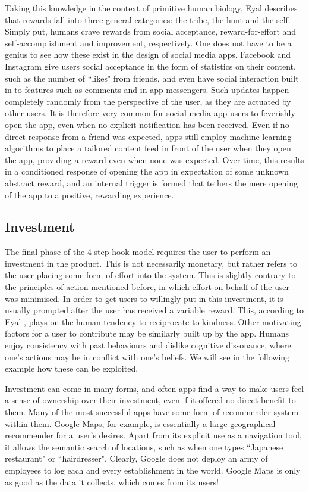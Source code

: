 Taking this knowledge in the context of primitive human biology, Eyal \cite{eyal2014hooked} describes that rewards fall into three general categories: the tribe, the hunt and the self. Simply put, humans crave rewards from social acceptance, reward-for-effort and self-accomplishment and improvement, respectively. One does not have to be a genius to see how these exist in the design of social media apps. Facebook and Instagram give users social acceptance in the form of statistics on their content, such as the number of ``likes" from friends, and even have social interaction built in to features such as comments and in-app messengers. Such updates happen completely randomly from the perspective of the user, as they are actuated by other users. It is therefore very common for social media app users to feverishly open the app, even when no explicit notification has been received. Even if no direct response from a friend was expected, apps still employ machine learning algorithms to place a tailored content feed in front of the user when they open the app, providing a reward even when none was expected. Over time, this results in a conditioned response of opening the app in expectation of some unknown abstract reward, and an internal trigger is formed that tethers the mere opening of the app to a positive, rewarding experience.

\subsection{Investment}
The final phase of the 4-step hook model requires the user to perform an investment in the product. This is not necessarily monetary, but rather refers to the user placing some form of effort into the system. This is slightly contrary to the principles of action mentioned before, in which effort on behalf of the user was minimised. In order to get users to willingly put in this investment, it is usually prompted after the user has received a variable reward. This, according to Eyal \cite{eyal2014hooked}, plays on the human tendency to reciprocate to kindness. Other motivating factors for a user to contribute may be similarly built up by the app. Humans enjoy consistency with past behaviours and dislike cognitive dissonance, where one's actions may be in conflict with one's beliefs. We will see in the following example how these can be exploited.

Investment can come in many forms, and often apps find a way to make users feel a sense of ownership over their investment, even if it offered no direct benefit to them. Many of the most successful apps have some form of recommender system within them. Google Maps, for example, is essentially a large geographical recommender for a user's desires. Apart from its explicit use as a navigation tool, it allows the semantic search of locations, such as when one types ``Japanese restaurant" or ``hairdresser". Clearly, Google does not deploy an army of employees to log each and every establishment in the world. Google Maps is only as good as the data it collects, which comes from its users!

